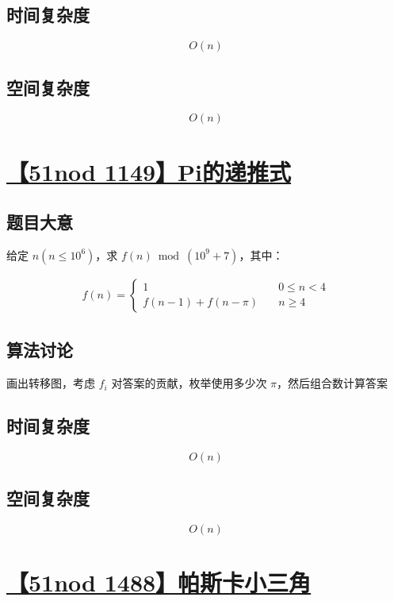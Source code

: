 \documentclass[UTF8]{article}
\begin{document}
\subsection{时间复杂度}

$$
O(n)
$$

\subsection{空间复杂度}

$$
O(n)
$$

\section{\href{https://www.51nod.com/Challenge/Problem.html?problemId=1149}{【51nod 1149】Pi的递推式}}

\subsection{题目大意}

给定 $n(n \le 10^6)$，求 $f(n) \bmod (10^9+7)$，其中：

$$
\begin{aligned}
f(n)=\begin{cases}
1 &\quad 0 \le n < 4 \\
f(n-1) + f(n-\pi) &\quad n \ge 4
\end{cases}
\end{aligned}
$$

\subsection{算法讨论}

画出转移图，考虑 $f_i$ 对答案的贡献，枚举使用多少次 $\pi$，然后组合数计算答案

\subsection{时间复杂度}

$$
O(n)
$$

\subsection{空间复杂度}

$$
O(n)
$$

\section{\href{https://www.51nod.com/Challenge/Problem.html?problemId=1488}{【51nod 1488】帕斯卡小三角}}
\end{document}

